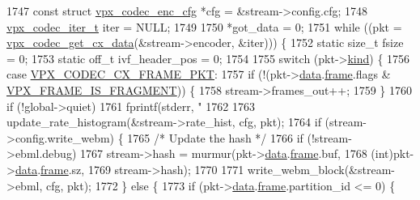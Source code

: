 \begin{DoxyCodeInclude}
{{{{{{{{{{{{{{{{{{{{{{{{{{{{{{{{{{{{{{{{{{{{{{{{1747   \textcolor{keyword}{const} \textcolor{keyword}{struct }\hyperlink{structvpx__codec__enc__cfg}{vpx\_codec\_enc\_cfg} *cfg = &stream->config.cfg;
1748   \hyperlink{group__codec_ga6ea348f76b1f8a1fe50e14db684146c6}{vpx\_codec\_iter\_t} iter = NULL;
1749 
1750   *got\_data = 0;
1751   \textcolor{keywordflow}{while} ((pkt = \hyperlink{group__encoder_gae81cab25d66cf3bc59f1f75f8a5af720}{vpx\_codec\_get\_cx\_data}(&stream->encoder, &iter))) \{
1752     \textcolor{keyword}{static} \textcolor{keywordtype}{size\_t} fsize = 0;
1753     \textcolor{keyword}{static} off\_t ivf\_header\_pos = 0;
1754 
1755     \textcolor{keywordflow}{switch} (pkt->\hyperlink{structvpx__codec__cx__pkt_a41f395b39516343c1329a4a85a0084f2}{kind}) \{
1756       \textcolor{keywordflow}{case} \hyperlink{group__encoder_gga28a79375279536526552af3a83d2ed72a2261aae5594289400e812fb1e6b6b0cc}{VPX\_CODEC\_CX\_FRAME\_PKT}:
1757         \textcolor{keywordflow}{if} (!(pkt->\hyperlink{structvpx__codec__cx__pkt_a7f97b060a23b7e89fe5b885c0074f696}{data}.\hyperlink{structvpx__codec__cx__pkt_a81e33bf4408a3983abb16492fee359ff}{frame}.flags & \hyperlink{group__encoder_gafb9f7dbf9b8a764c521d8b12c0e6959d}{VPX\_FRAME\_IS\_FRAGMENT})) \{
1758           stream->frames\_out++;
1759         \}
1760         \textcolor{keywordflow}{if} (!global->quiet)
1761           fprintf(stderr, \textcolor{stringliteral}{" %
1762 
1763         update\_rate\_histogram(&stream->rate\_hist, cfg, pkt);
1764         \textcolor{keywordflow}{if} (stream->config.write\_webm) \{
1765           \textcolor{comment}{/* Update the hash */}
1766           \textcolor{keywordflow}{if} (!stream->ebml.debug)
1767             stream->hash = murmur(pkt->\hyperlink{structvpx__codec__cx__pkt_a7f97b060a23b7e89fe5b885c0074f696}{data}.\hyperlink{structvpx__codec__cx__pkt_a81e33bf4408a3983abb16492fee359ff}{frame}.buf,
1768                                   (\textcolor{keywordtype}{int})pkt->\hyperlink{structvpx__codec__cx__pkt_a7f97b060a23b7e89fe5b885c0074f696}{data}.\hyperlink{structvpx__codec__cx__pkt_a81e33bf4408a3983abb16492fee359ff}{frame}.sz,
1769                                   stream->hash);
1770 
1771           write\_webm\_block(&stream->ebml, cfg, pkt);
1772         \} \textcolor{keywordflow}{else} \{
1773           \textcolor{keywordflow}{if} (pkt->\hyperlink{structvpx__codec__cx__pkt_a7f97b060a23b7e89fe5b885c0074f696}{data}.\hyperlink{structvpx__codec__cx__pkt_a81e33bf4408a3983abb16492fee359ff}{frame}.partition\_id <= 0) \{
}}}}}}}}}}}}}}}}}}}}}}}}}}}}}}}}}}}}}}}}}}}}}}}}}
\end{DoxyCodeInclude}
